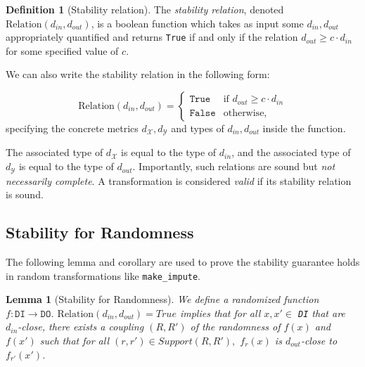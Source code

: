 \documentclass[11pt,a4paper]{article}
\newtheorem{lemma}{Lemma}
\theoremstyle{definition}
\newtheorem{definition}{Definition}[section]
\newcommand{\din}{d_{in}}
\newcommand{\dout}{d_{out}}
\newcommand{\Relation}{\mathrm{Relation}}
\newcommand{\X}{\mathcal{X}}
\newcommand{\Y}{\mathcal{Y}}
\newcommand{\True}{\texttt{True}}
\newcommand{\False}{\texttt{False}}
\newcommand{\silvia}[1]{{ {\color{blue}{(silvia)~#1}}}}
\newcommand{\grace}[1]{{ {\color{purple}{(grace)~#1}}}}
\begin{document}
\begin{definition}[Stability relation]
    The \textit{stability relation}, denoted $\Relation(\din, \dout)$, is a boolean function which takes as input some $\din, \dout$ appropriately quantified and returns \texttt{True} if and only if the relation $\dout \geq c \cdot \din$ for some specified value of $c$. 
\end{definition}

We can also write the stability relation in the following form:

\begin{equation}
    \Relation(\din, \dout) = 
    \begin{cases} 
      \True & \textrm{if } \dout \geq c \cdot \din \\
      \False & \textrm{otherwise},
   \end{cases}
\end{equation}
specifying the concrete metrics $d_{\X}, d_{\Y}$ and types of $\din, \dout$ inside the function.

The associated type of $d_{\X}$ is equal to the type of $\din$, and the associated type of $d_{\Y}$ is equal to the type of $\dout$. Importantly, such relations are sound but \textit{not necessarily complete}. A transformation is considered \textit{valid} if its stability relation is sound.


\subsection{Stability for Randomness}


The following lemma and corollary are used to prove the stability guarantee holds in random transformations like \texttt{make\_impute}. 
\begin{lemma}[Stability for Randomness]
We define a randomized function $f: \texttt{DI} \rightarrow \texttt{DO}$. $\Relation(d_{in}, d_{out}) = True$ implies that for all $x, x' \in$ \texttt{DI} that are $d_{in}$-close, there exists a coupling $(R, R')$ of the randomness of $f(x)$ and $f(x')$ such that for all $(r, r') \in Support(R, R'),$ $f_r(x)$ is $d_{out}$-close to $f_{r'}(x')$.
\end{lemma}

\silvia{Proof?}
\end{document}
